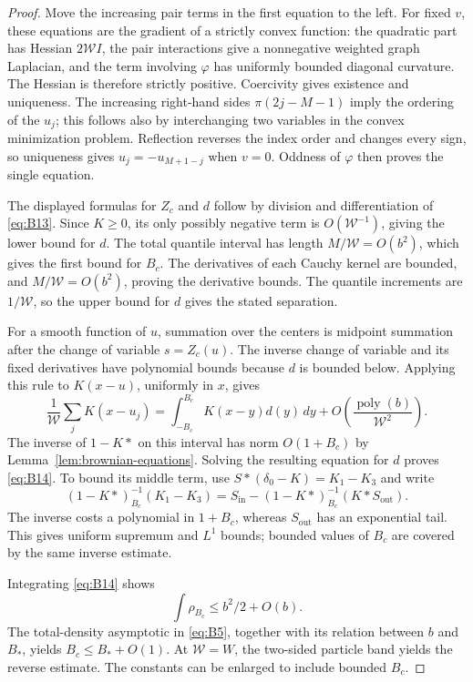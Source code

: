 \begin{proof}
Move the increasing pair terms in the first equation to the left.  For
fixed $v$, these equations are the gradient of a strictly convex function:
the quadratic part has Hessian $2\mathcal W I$, the pair interactions
give a nonnegative weighted graph Laplacian, and the term involving
$\varphi$ has uniformly bounded diagonal curvature.  The Hessian is
therefore strictly positive.  Coercivity gives existence and uniqueness.
The increasing right-hand sides $\pi(2j-M-1)$ imply the ordering of the
$u_j$; this follows also by interchanging two variables in the convex
minimization problem.  Reflection reverses the index order and changes
every sign, so uniqueness gives $u_j=-u_{M+1-j}$ when $v=0$.
Oddness of $\varphi$ then proves the single equation.

The displayed formulas for $Z_c$ and $d$ follow by division and
differentiation of \eqref{eq:B13}.  Since $K\geq0$, its only possibly
negative term is $O(\mathcal W^{-1})$, giving the lower bound for $d$.
The total quantile interval has length $M/\mathcal W=O(b^2)$, which gives
the first bound for $B_c$.  The derivatives of each Cauchy kernel are
bounded, and $M/\mathcal W=O(b^2)$, proving the derivative bounds.  The
quantile increments are $1/\mathcal W$, so the upper bound for $d$ gives
the stated separation.

For a smooth function of $u$, summation over the centers is midpoint
summation after the change of variable $s=Z_c(u)$.  The inverse change of
variable and its fixed derivatives have polynomial bounds because $d$
is bounded below.  Applying this rule to $K(x-u)$, uniformly in $x$, gives
\[
 \frac1{\mathcal W}\sum_jK(x-u_j)
   =\int_{-B_c}^{B_c}K(x-y)d(y)\,dy
       +O\!\left(\frac{\operatorname{poly}(b)}{\mathcal W^2}\right).
\]
The inverse of $1-K*$ on this interval has norm $O(1+B_c)$ by
Lemma~\ref{lem:brownian-equations}.  Solving the resulting equation for
$d$ proves \eqref{eq:B14}.  To bound its middle term, use
$S*(\delta_0-K)=K_1-K_3$ and write
\[
 (1-K*)_{B_c}^{-1}(K_1-K_3)
    =S_{\mathrm{in}}
      -(1-K*)_{B_c}^{-1}(K*S_{\mathrm{out}}).
\]
The inverse costs a polynomial in $1+B_c$, whereas $S_{\mathrm{out}}$
has an exponential tail.  This gives uniform supremum and $L^1$ bounds;
bounded values of $B_c$ are covered by the same inverse estimate.

Integrating \eqref{eq:B14} shows
\[
 \int\rho_{B_c}\leq b^2/2+O(b).
\]
The total-density asymptotic in \eqref{eq:B5}, together with its relation between
$b$ and $B_*$, yields $B_c\leq B_*+O(1)$.  At $\mathcal W=W$, the
two-sided particle band yields the reverse estimate.  The constants can
be enlarged to include bounded $B_c$.


\end{proof}
